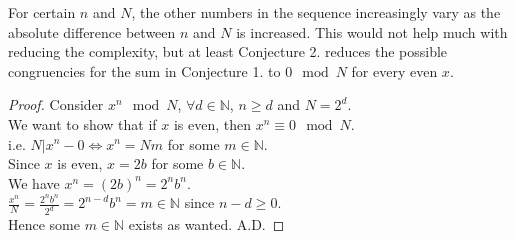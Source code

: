 \documentclass{article}
\begin{document}
\begin{flushleft}
    \vspace{.1in}

    For certain $n$ and $N$, the other numbers in the sequence increasingly vary as the absolute difference between $n$ and $N$ is increased. This  would not help much with reducing the complexity, but at least Conjecture 2. reduces the possible congruencies for the sum in Conjecture 1. to $0\mod N$ for every even $x$.

    \vspace{.1in}

    \begin{proof}
        Consider $x^n\mod N$, $\forall d\in {\mathbb{N}}$, $n\ge d$ and $N=2^d$.\\
        We want to show that if $x$ is even, then $x^n\equiv 0 \mod N$.\\
        \hspace{.2in} i.e. $N|x^n-0 \Longleftrightarrow x^n=Nm$ for some $m\in{\mathbb{N}}$.\\
        Since $x$ is even, $x=2b$ for some $b\in{\mathbb{N}}$.\\
        We have $x^n=(2b)^n=2^nb^n$.\\
        \vspace{.1in}
        $\displaystyle \frac{x^n}{N}=\frac{2^nb^n}{2^d}=2^{n-d}b^n=m\in{\mathbb{N}}$ since $n-d\ge 0$.\\
        \vspace{.1in}
    Hence some $m\in{\mathbb{N}}$ exists as wanted. \hspace{1.9in} A.D.
    \end{proof}

    \vspace{.1in}


\end{flushleft}
\end{document}
